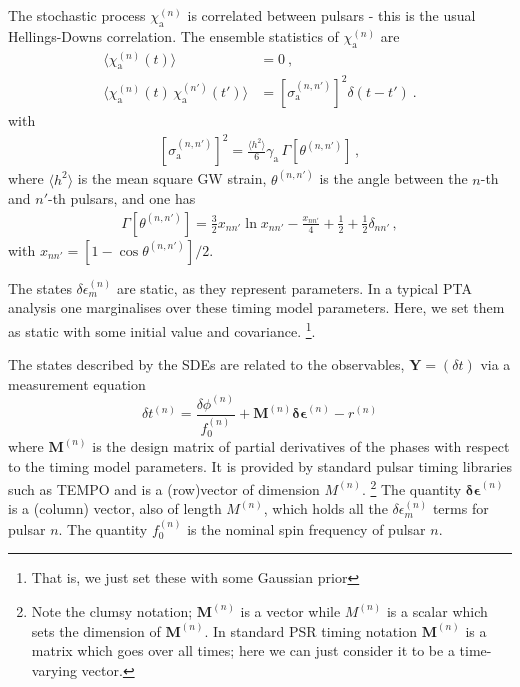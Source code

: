 \documentclass{tufte-handout} %
\begin{document}
The stochastic process $\chi_{\mathrm a}^{(n)}$  is correlated between pulsars - this is the usual Hellings-Downs correlation. The ensemble statistics of $\chi_{\mathrm a}^{(n)}$ are
\begin{align}
	\langle \chi^{(n)}_{\mathrm a}(t) \rangle &= 0 \ , 	\label{eq:xieqn1} \\
	\langle \chi^{(n)}_{\mathrm a}(t) \, \chi^{(n')}_{\mathrm a}(t') \rangle &= \left[\sigma^{(n,n')}_{\mathrm a}\right]^2 \delta(t - t') \ .	\label{eq:xieqn2}
\end{align}
with
\begin{eqnarray}
	\left[\sigma^{(n,n')}_{\mathrm a}\right]^2 = \frac{\langle h^2\rangle}{6} \gamma_{\mathrm a} \, \Gamma \left[ \theta^{(n,n')} \right] \, , \label{eq:sigma_a_expression}
\end{eqnarray}
where $\langle h^2 \rangle$ is the mean square GW strain, $\theta^{(n,n')}$ is the angle between the $n$-th and $n'$-th pulsars, and one has
\begin{eqnarray}
	\Gamma\left[\theta^{(n,n')} \right] =  \frac{3}{2} x_{n n'} \ln x_{n n'}  -\frac{x_{n n'} }{4}+\frac{1}{2} + \frac{1}{2} \delta_{n n'}\label{eq:correlation} \, ,
\end{eqnarray}
with $x_{nn'} = \left[1 - \cos \theta^{(n,n')}\right]/2$. \newline 


The states $\delta \epsilon^{(n)}_{m}$ are static, as they represent parameters. In a typical PTA analysis one marginalises over these timing model parameters. Here, we set them as static with some initial value and covariance.  \footnote{That is, we just set these with some Gaussian prior}. \newline 

The states described by the SDEs are related to the observables, $\boldsymbol{Y} = \left(\delta t \right) $ via a measurement equation
\begin{equation}
	\delta t^{(n)} = \frac{\delta \phi^{(n)}}{f_0^{(n)}} + \mathbf{M}^{(n)} \boldsymbol{\delta \epsilon}^{(n)} - r^{(n)} \label{eq:meas}
\end{equation}
where $\mathbf{M}^{(n)}$ is the design matrix of partial derivatives of the phases with respect to the timing model parameters. It is provided by standard pulsar timing libraries such as TEMPO and is a (row)vector of dimension $M^{(n)}$. \footnote{Note the clumsy notation; $\mathbf{M}^{(n)}$ is a vector while $M^{(n)}$ is a scalar which sets the dimension of $\mathbf{M}^{(n)}$. In standard PSR timing notation $\mathbf{M}^{(n)}$ is a matrix which goes over all times; here we can just consider it to be a time-varying vector.} The quantity $\boldsymbol{\delta \epsilon}^{(n)}$ is a (column) vector, also of length $M^{(n)}$, which holds all the $\delta \epsilon^{(n)}_{m}$ terms for pulsar $n$.
The quantity $f_0^{(n)}$ is the nominal spin frequency of pulsar $n$.
\end{document}

